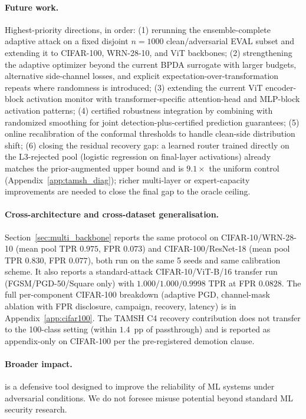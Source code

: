 \paragraph{Future work.}
Highest-priority directions, in order:
(1) rerunning the ensemble-complete adaptive attack on a fixed disjoint
$n{=}1000$ clean/adversarial EVAL subset and extending it to CIFAR-100,
WRN-28-10, and ViT backbones;
(2) strengthening the adaptive optimizer beyond the current BPDA
surrogate with larger budgets, alternative side-channel losses, and
explicit expectation-over-transformation repeats where randomness is
introduced;
(3) extending the current ViT encoder-block activation monitor with
transformer-specific attention-head and MLP-block activation patterns;
(4) certified robustness integration by combining \prism with randomized
smoothing \cite{cohen2019certified} for joint detection-plus-certified
prediction guarantees;
(5) online recalibration of the conformal thresholds to handle clean-side
distribution shift;
(6) closing the residual \tamsh recovery gap: a learned router trained
directly on the L3-rejected pool (logistic regression on final-layer
activations) already matches the prior-augmented upper bound and is
$9.1\times$ the uniform control (Appendix~\ref{app:tamsh_diag}); richer
multi-layer or expert-capacity improvements are needed to close the final
gap to the
oracle ceiling.

\paragraph{Cross-architecture and cross-dataset generalisation.}
Section~\ref{sec:multi_backbone} reports the same protocol on
CIFAR-10/WRN-28-10 (mean pool TPR $0.975$, FPR $0.073$) and
CIFAR-100/ResNet-18 (mean pool TPR $0.830$, FPR $0.077$), both run
on the same 5 seeds and same calibration scheme. It also reports a
standard-attack CIFAR-10/ViT-B/16 transfer run (FGSM/PGD-50/Square only)
with $1.000/1.000/0.9998$ TPR at FPR $0.0828$.
The full per-component CIFAR-100 breakdown (adaptive PGD,
channel-mask ablation with FPR disclosure, campaign, recovery, latency)
is in Appendix~\ref{app:cifar100}. The TAMSH C4 recovery contribution
does not transfer to the 100-class setting (within $1.4$~pp of
passthrough) and is reported as appendix-only on CIFAR-100 per the
pre-registered demotion clause.

\paragraph{Broader impact.}
\prism is a defensive tool designed to improve the reliability 
of ML systems under adversarial conditions.
We do not foresee misuse potential beyond standard ML security research.
